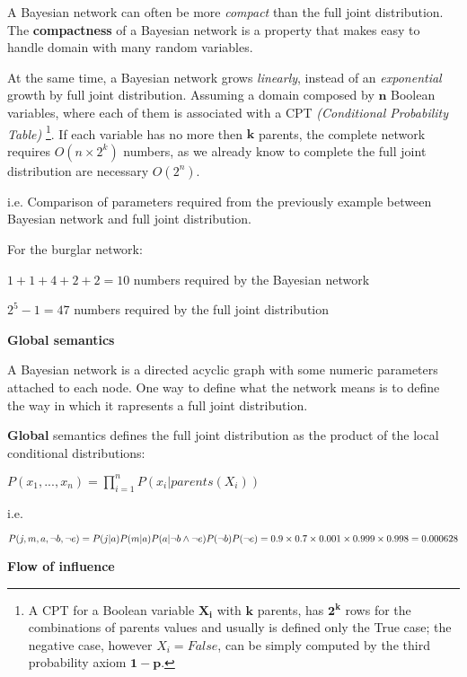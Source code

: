 A Bayesian network can often be more \textit{compact} than the full joint distribution. The \textbf{compactness} of a Bayesian network is a property that makes easy to handle
domain with many random variables. \vspace{3.5pt}

At the same time, a Bayesian network grows \textit{linearly}, instead of an \textit{exponential} growth by full joint distribution. Assuming a domain composed by $\mathbf{n}$ Boolean
variables, where each of them is associated with a CPT \textit{(Conditional Probability Table)} \footnote{A CPT for a Boolean variable $\mathbf{X_i}$ with $\mathbf{k}$ parents, has $\mathbf{2^k}$
rows for the combinations of parents values and usually is defined only the True case; the negative case, however $X_i = False$, can be simply computed by the third probability axiom $\mathbf{1 - p}$.}.
If each variable has no more then $\mathbf{k}$ parents, the complete network requires $O(n \times 2^k)$ numbers, as we already know to complete the full joint distribution are necessary
$O(2^n)$.
\begin{example}
    i.e. Comparison of parameters required from the previously example between Bayesian network and full joint distribution. \vspace{3.5pt}

    For the burglar network: \vspace{3.5pt}

    $1 + 1 + 4 + 2 + 2 = 10$ numbers required by the Bayesian network \vspace{3.5pt}

    $2^5 - 1 = 47$ numbers required by the full joint distribution
\end{example}
\textbf{Global semantics} \vspace{3.5pt}

A Bayesian network is a directed acyclic graph with some numeric parameters attached to each node. One way to define what the network means is to define the way in which 
it rapresents a full joint distribution. 
\begin{definition}
    \textbf{Global} semantics defines the full joint distribution as the product of the local conditional distributions:
    \begin{center}
        $P(x_1, ..., x_n) = \prod_{i = 1}^{n} P(x_i|parents(X_i))$
    \end{center}
\end{definition}
\begin{example}
    i.e. 
    
    $P(j, m, a, \neg b, \neg e) \\
    = P(j|a)P(m|a)P(a|\neg b \wedge \neg e)P(\neg b)P(\neg e) \\
    = 0.9 \times 0.7 \times 0.001 \times 0.999 \times 0.998 = 0.000628$
\end{example}
\textbf{Flow of influence} \vspace{3.5pt}

